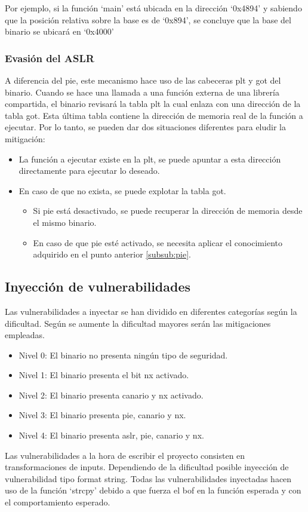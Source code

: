 Por ejemplo, si la función `main' está ubicada en la dirección `0x4894' y sabiendo que la posición relativa sobre la base es de `0x894', se concluye que la base del binario se ubicará en `0x4000'
\subsubsection{Evasión del ASLR}
A diferencia del \acrshort{pie}, este mecanismo hace uso de las cabeceras \acrfull{plt} y \acrfull{got} del binario.
Cuando se hace una llamada a una función externa de una librería compartida, el binario revisará la tabla \acrshort{plt} la cual enlaza con una dirección de la tabla \acrshort{got}.
Esta última tabla contiene la dirección de memoria real de la función a ejecutar.
Por lo tanto, se pueden dar dos situaciones diferentes para eludir la mitigación:
\begin{itemize}
    \item La función a ejecutar existe en la \acrshort{plt}, se puede apuntar a esta dirección directamente para ejecutar lo deseado.
    \item En caso de que no exista, se puede explotar la tabla \acrshort{got}.
    \begin{itemize}
        \item Si \acrshort{pie} está desactivado, se puede recuperar la dirección de memoria desde el mismo binario.
        \item En caso de que \acrshort{pie} esté activado, se necesita aplicar el conocimiento adquirido en el punto anterior \ref{subsub:pie}.
    \end{itemize}
\end{itemize}

\subsection{Inyección de vulnerabilidades} \label{subsec:vulns}
Las vulnerabilidades a inyectar se han dividido en diferentes categorías según la dificultad.
Según se aumente la dificultad mayores serán las mitigaciones empleadas.
\begin{itemize}
    \item Nivel 0: El binario no presenta ningún tipo de seguridad.
    \item Nivel 1: El binario presenta el bit \acrshort{nx} activado.
    \item Nivel 2: El binario presenta canario y \acrshort{nx} activado.
    \item Nivel 3: El binario presenta \acrshort{pie}, canario y \acrshort{nx}.
    \item Nivel 4: El binario presenta \acrshort{aslr}, \acrshort{pie}, canario y \acrshort{nx}.
\end{itemize}
Las vulnerabilidades a la hora de escribir el proyecto consisten en transformaciones de inputs.
Dependiendo de la dificultad posible inyección de vulnerabilidad tipo format string.
Todas las vulnerabilidades inyectadas hacen uso de la función `strcpy' debido a que fuerza el \acrshort{bof} en la función esperada y con el comportamiento esperado.

